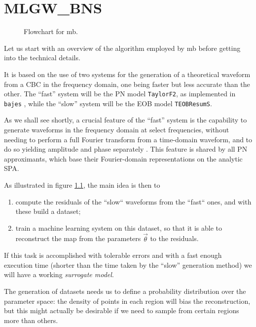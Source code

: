 \documentclass[main.tex]{subfiles}
\begin{document}
\chapter{MLGW\_BNS}

\begin{figure}[ht]
\centering

\caption{Flowchart for \ac{mb}.}
\label{fig:flowchart}
\end{figure}

\newpage

Let us start with an overview of the algorithm employed by \ac{mb} before getting into the technical details. 

It is based on the use of two systems for the generation of a theoretical waveform from a \ac{CBC} in the frequency domain, one being faster but less accurate than the other.
The ``fast'' system will be the \ac{PN} model \texttt{TaylorF2}, as implemented in \texttt{bajes} \cite[]{breschiTtBajesBayesian2021}, while the ``slow'' system will be the \ac{EOB} model \texttt{TEOBResumS}.

As we shall see shortly, a crucial feature of the ``fast'' system is the capability to generate waveforms in the frequency domain at select frequencies, without needing to perform a full Fourier transform from a time-domain waveform, and to do so yielding amplitude and phase separately .
This feature is shared by all \ac{PN} approximants, which base their Fourier-domain representations on the analytic \ac{SPA}.

As illustrated in figure \ref{fig:flowchart}, the main idea is then to 
\begin{enumerate}
    \item compute the residuals of the ``slow`` waveforms from the ``fast`` ones, and with these build a dataset;
    \item train a machine learning system on this dataset, so that it is able to reconstruct the map from the parameters \(\vec{\theta}\) to the residuals.
\end{enumerate}

If this task is accomplished with tolerable errors and with a fast enough execution time (shorter than the time taken by the ``slow'' generation method) we will have a working \emph{surrogate model}. 

The generation of datasets needs us to define a probability distribution over the parameter space: the density of points in each region will bias the reconstruction, but this might actually be desirable if we need to sample from certain regions more than others. 
\end{document}
